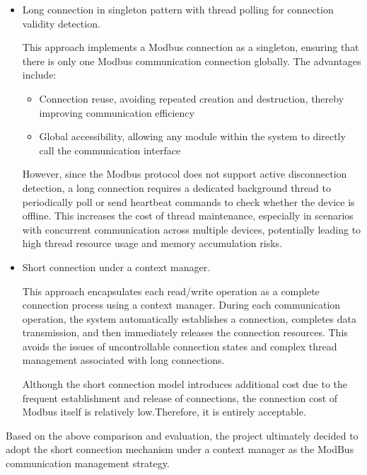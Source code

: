 \documentclass[
english,
ruledheaders=section,%
class=report,%
thesis={type=Report},%
accentcolor=9c,%
custommargins=true,%
marginpar=false,%
parskip=half-,%
fontsize=11pt,%
logofile={img/tuda_logo.pdf}, %
]{tudapub}
\begin{document}
    \begin{itemize}
        \item Long connection in singleton pattern with thread polling for connection validity detection.

        This approach implements a Modbus connection as a singleton, ensuring that there is only one Modbus communication connection globally. The advantages include:
        \begin{itemize}
            \item Connection reuse, avoiding repeated creation and destruction, thereby improving communication efficiency
            \item Global accessibility, allowing any module within the system to directly call the communication interface
        \end{itemize}

        However, since the Modbus protocol does not support active disconnection detection, a long connection requires a dedicated background thread to periodically poll or send heartbeat commands to check whether the device is offline. This increases the cost of thread maintenance, especially in scenarios with concurrent communication across multiple devices, potentially leading to high thread resource usage and memory accumulation risks.

        \item Short connection under a context manager.

        This approach encapsulates each read/write operation as a complete connection process using a context manager. During each communication operation, the system automatically establishes a connection, completes data transmission, and then immediately releases the connection resources. This avoids the issues of uncontrollable connection states and complex thread management associated with long connections.

        Although the short connection model introduces additional cost due to the frequent establishment and release of connections, the connection cost of Modbus itself is relatively low.Therefore, it is entirely acceptable.
    \end{itemize}

    Based on the above comparison and evaluation, the project ultimately decided to adopt the short connection mechanism under a context manager as the ModBus communication management strategy.
\end{document}
